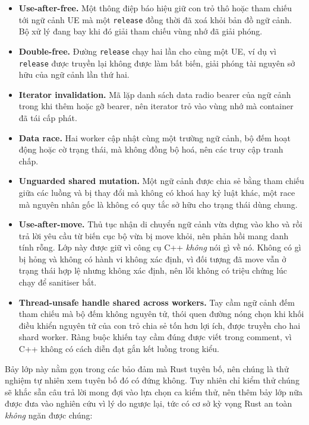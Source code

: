 \begin{itemize}
  \item \textbf{Use-after-free.} Một thông điệp báo hiệu giữ con trỏ thô hoặc tham chiếu tới
        ngữ cảnh UE mà một \texttt{release} đồng thời đã xoá khỏi bản đồ ngữ cảnh. Bộ xử lý
        đang bay khi đó giải tham chiếu vùng nhớ đã giải phóng.
  \item \textbf{Double-free.} Đường \texttt{release} chạy hai lần cho cùng một UE, ví dụ vì
        \texttt{release} được truyền lại không được làm bất biến, giải phóng tài nguyên sở hữu
        của ngữ cảnh lần thứ hai.
  \item \textbf{Iterator invalidation.} Mã lặp danh sách data radio bearer của ngữ cảnh trong khi
        thêm hoặc gỡ bearer, nên iterator trỏ vào vùng nhớ mà container đã tái cấp phát.
  \item \textbf{Data race.} Hai worker cập nhật cùng một trường ngữ cảnh, bộ đếm hoạt động hoặc
        cờ trạng thái, mà không đồng bộ hoá, nên các truy cập tranh chấp.
  \item \textbf{Unguarded shared mutation.} Một ngữ cảnh được chia sẻ bằng tham chiếu giữa các
        luồng và bị thay đổi mà không có khoá hay kỷ luật khác, một race mà nguyên nhân gốc là
        không có quy tắc sở hữu cho trạng thái dùng chung.
  \item \textbf{Use-after-move.} Thủ tục nhận di chuyển ngữ cảnh vừa dựng vào kho và rồi trả lời
        yêu cầu từ biến cục bộ vừa bị move khỏi, nên phản hồi mang danh tính rỗng. Lớp này được
        giữ vì công cụ C++ \emph{không} nói gì về nó. Không có gì bị hỏng và không có hành vi
        không xác định, vì đối tượng đã move vẫn ở trạng thái hợp lệ nhưng không xác định, nên
        lỗi không có triệu chứng lúc chạy để sanitiser bắt.
  \item \textbf{Thread-unsafe handle shared across workers.} Tay cầm ngữ cảnh đếm tham chiếu mà
        bộ đếm không nguyên tử, thói quen đường nóng chọn khi khối điều khiển nguyên tử của con
        trỏ chia sẻ tốn hơn lợi ích, được truyền cho hai shard worker. Ràng buộc khiến tay cầm
        đúng được viết trong comment, vì C++ không có cách diễn đạt gắn kết luồng trong kiểu.
\end{itemize}

Bảy lớp này nằm gọn trong các bảo đảm mà Rust tuyên bố, nên chúng là thử nghiệm tự nhiên xem
tuyên bố đó có đứng không. Tuy nhiên chỉ kiểm thử chúng sẽ khắc sẵn câu trả lời mong đợi vào
lựa chọn ca kiểm thử, nên thêm bảy lớp nữa được đưa vào nghiên cứu vì lý do ngược lại, tức có cơ
sở kỳ vọng Rust an toàn \emph{không} ngăn được chúng:

